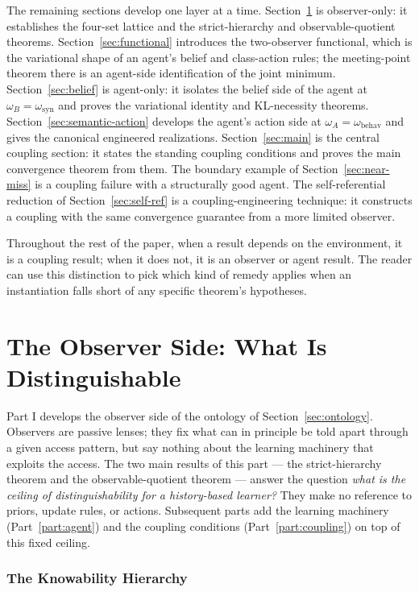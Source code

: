 \documentclass[11pt]{article}
\theoremstyle{definition}
\theoremstyle{remark}
\begin{document}
The remaining sections develop one layer at a time. Section~\ref{sec:hierarchy} is observer-only: it establishes the four-set lattice and the strict-hierarchy and observable-quotient theorems. Section~\ref{sec:functional} introduces the two-observer functional, which is the variational shape of an agent's belief and class-action rules; the meeting-point theorem there is an agent-side identification of the joint minimum. Section~\ref{sec:belief} is agent-only: it isolates the belief side of the agent at $\omega_B=\omega_{\mathrm{syn}}$ and proves the variational identity and KL-necessity theorems. Section~\ref{sec:semantic-action} develops the agent's action side at $\omega_A=\omega_{\mathrm{behav}}$ and gives the canonical engineered realizations. Section~\ref{sec:main} is the central coupling section: it states the standing coupling conditions and proves the main convergence theorem from them. The boundary example of Section~\ref{sec:near-miss} is a coupling failure with a structurally good agent. The self-referential reduction of Section~\ref{sec:self-ref} is a coupling-engineering technique: it constructs a coupling with the same convergence guarantee from a more limited observer.

Throughout the rest of the paper, when a result depends on the environment, it is a coupling result; when it does not, it is an observer or agent result. The reader can use this distinction to pick which kind of remedy applies when an instantiation falls short of any specific theorem's hypotheses.

\part{The Observer Side: What Is Distinguishable}
\label{part:observer}

Part I develops the observer side of the ontology of Section~\ref{sec:ontology}. Observers are passive lenses; they fix what can in principle be told apart through a given access pattern, but say nothing about the learning machinery that exploits the access. The two main results of this part --- the strict-hierarchy theorem and the observable-quotient theorem --- answer the question \emph{what is the ceiling of distinguishability for a history-based learner?} They make no reference to priors, update rules, or actions. Subsequent parts add the learning machinery (Part~\ref{part:agent}) and the coupling conditions (Part~\ref{part:coupling}) on top of this fixed ceiling.

\section{The Knowability Hierarchy}
\label{sec:hierarchy}
\end{document}
